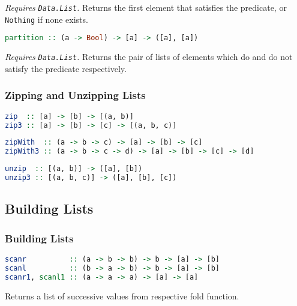 \documentclass[twocolumn,english]{article}
\begin{document}
\emph{Requires }\texttt{\emph{Data.List}}\emph{.} Returns the first
element that satisfies the predicate, or \texttt{Nothing} if none
exists.

\begin{lstlisting}[language=Haskell,frame=single]
partition :: (a -> Bool) -> [a] -> ([a], [a])
\end{lstlisting}


\emph{Requires }\texttt{\emph{Data.List}}\emph{.} Returns the pair
of lists of elements which do and do not satisfy the predicate respectively.


\subsubsection{Zipping and Unzipping Lists}

\begin{lstlisting}[language=Haskell,frame=single]
zip  :: [a] -> [b] -> [(a, b)]
zip3 :: [a] -> [b] -> [c] -> [(a, b, c)]
\end{lstlisting}


\begin{lstlisting}[language=Haskell,frame=single]
zipWith  :: (a -> b -> c) -> [a] -> [b] -> [c]
zipWith3 :: (a -> b -> c -> d) -> [a] -> [b] -> [c] -> [d]
\end{lstlisting}


\begin{lstlisting}[language=Haskell,frame=single]
unzip  :: [(a, b)] -> ([a], [b])
unzip3 :: [(a, b, c)] -> ([a], [b], [c])
\end{lstlisting}



\subsection{Building Lists}


\subsubsection{Building Lists}

\begin{lstlisting}[language=Haskell,frame=single]
scanr          :: (a -> b -> b) -> b -> [a] -> [b]
scanl          :: (b -> a -> b) -> b -> [a] -> [b]
scanr1, scanl1 :: (a -> a -> a) -> [a] -> [a]
\end{lstlisting}


Returns a list of successive values from respective fold function.
\end{document}
